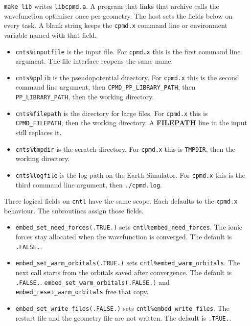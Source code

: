 \documentclass[twoside,10pt,titlepage,a4paper]{article}
\newcommand{\referto}[2]{\hyperlink{#1}{#2}}
\newcommand{\referto}[2]{\htmlref{#2}{#1}}
\newcommand{\refkeyword}[1]{%
\referto{#1}{\textbf{#1}}%
\index{#1}%
}%
\begin{document}
\texttt{make lib} writes \texttt{libcpmd.a}.
A program that links that archive calls the wavefunction optimiser once
per geometry.
The host sets the fields below on every task.
A blank string keeps the \texttt{cpmd.x} command line or environment
variable named with that field.

\begin{itemize}
\item \texttt{cnts\%inputfile} is the input file.
      For \texttt{cpmd.x} this is the first command line argument.
      The file interface reopens the same name.
\item \texttt{cnts\%pplib} is the pseudopotential directory.
      For \texttt{cpmd.x} this is the second command line argument, then
      \texttt{CPMD\_PP\_LIBRARY\_PATH}, then \texttt{PP\_LIBRARY\_PATH},
      then the working directory.
\item \texttt{cnts\%filepath} is the directory for large files.
      For \texttt{cpmd.x} this is \texttt{CPMD\_FILEPATH}, then the working
      directory.
      A \refkeyword{FILEPATH} line in the input still replaces it.
\item \texttt{cnts\%tmpdir} is the scratch directory.
      For \texttt{cpmd.x} this is \texttt{TMPDIR}, then the working directory.
\item \texttt{cnts\%logfile} is the log path on the Earth Simulator.
      For \texttt{cpmd.x} this is the third command line argument, then
      \texttt{./cpmd.log}.
\end{itemize}

Three logical fields on \texttt{cntl} have the same scope.
Each defaults to the \texttt{cpmd.x} behaviour.
The subroutines assign those fields.

\begin{itemize}
\item \texttt{embed\_set\_need\_forces(.TRUE.)} sets
      \texttt{cntl\%embed\_need\_forces}.
      The ionic forces stay allocated when the wavefunction is converged.
      The default is \texttt{.FALSE.}.
\item \texttt{embed\_set\_warm\_orbitals(.TRUE.)} sets
      \texttt{cntl\%embed\_warm\_orbitals}.
      The next call starts from the orbitals saved after convergence.
      The default is \texttt{.FALSE.}.
      \texttt{embed\_set\_warm\_orbitals(.FALSE.)} and
      \texttt{embed\_reset\_warm\_orbitals} free that copy.
\item \texttt{embed\_set\_write\_files(.FALSE.)} sets
      \texttt{cntl\%embed\_write\_files}.
      The restart file and the geometry file are not written.
      The default is \texttt{.TRUE.}.
\end{itemize}
\end{document}
